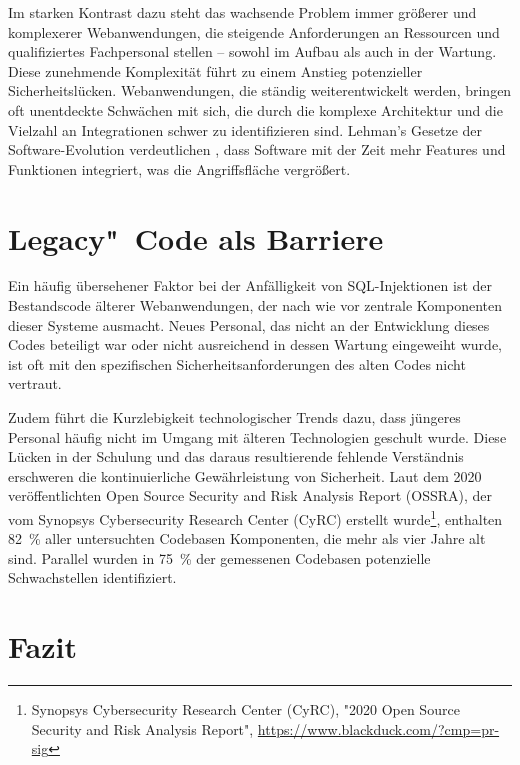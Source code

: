 \documentclass[a4paper,10pt,parskip,twocolumn]{article}
\begin{document}
    Im starken Kontrast dazu steht das wachsende Problem immer größerer und komplexerer Webanwendungen, die steigende Anforderungen an Ressourcen und qualifiziertes Fachpersonal stellen – sowohl im Aufbau als auch in der Wartung. Diese zunehmende Komplexität führt zu einem Anstieg potenzieller Sicherheitslücken. Webanwendungen, die ständig weiterentwickelt werden, bringen oft unentdeckte Schwächen mit sich, die durch die komplexe Architektur und die Vielzahl an Integrationen schwer zu identifizieren sind. Lehman's Gesetze der Software-Evolution verdeutlichen \cite{AMANATIDIS201648}, dass Software mit der Zeit mehr Features und Funktionen integriert, was die Angriffsfläche vergrößert.

\section{Legacy"~Code als Barriere}
    Ein häufig übersehener Faktor bei der Anfälligkeit von SQL-Injektionen ist der Bestandscode älterer Webanwendungen, der nach wie vor zentrale Komponenten dieser Systeme ausmacht. Neues Personal, das nicht an der Entwicklung dieses Codes beteiligt war oder nicht ausreichend in dessen Wartung eingeweiht wurde, ist oft mit den spezifischen Sicherheitsanforderungen des alten Codes nicht vertraut. \par 
    Zudem führt die Kurzlebigkeit technologischer Trends dazu, dass jüngeres Personal häufig nicht im Umgang mit älteren Technologien geschult wurde. Diese Lücken in der Schulung und das daraus resultierende fehlende Verständnis erschweren die kontinuierliche Gewährleistung von Sicherheit. Laut dem 2020 veröffentlichten Open Source Security and Risk Analysis Report (OSSRA), der vom Synopsys Cybersecurity Research Center (CyRC) erstellt wurde\footnote{Synopsys Cybersecurity Research Center (CyRC), "2020 Open Source Security and Risk Analysis Report", \url{https://www.blackduck.com/?cmp=pr-sig}}, enthalten 82~\% aller untersuchten Codebasen Komponenten, die mehr als vier Jahre alt sind. Parallel wurden in 75~\% der gemessenen Codebasen potenzielle Schwachstellen identifiziert. 
    

\section{Fazit}
\end{document}
